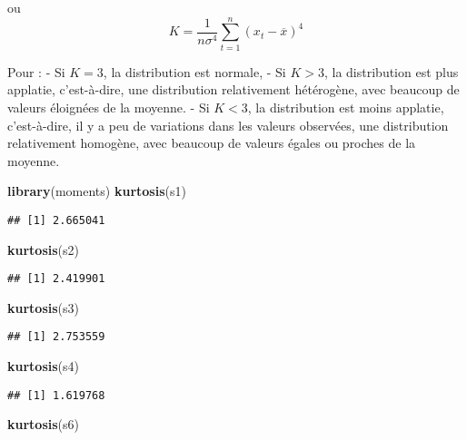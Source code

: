 \documentclass[
]{book}
\newenvironment{Shaded}{\begin{snugshade}}{\end{snugshade}}
\newcommand{\FunctionTok}[1]{\textcolor[rgb]{0.13,0.29,0.53}{\textbf{#1}}}
\newcommand{\NormalTok}[1]{#1}
\theoremstyle{definition}
\theoremstyle{definition}
\theoremstyle{definition}
\theoremstyle{definition}
\theoremstyle{remark}
\begin{document}
ou
\[K = \frac{1}{n\sigma^4} \sum_{t=1}^n (x_t - \overline{x})^4 \]

Pour :
- Si \(K=3\), la distribution est normale,
- Si \(K>3\), la distribution est plus applatie, c'est-à-dire, une distribution relativement hétérogène, avec beaucoup de valeurs éloignées de la moyenne.
- Si \(K<3\), la distribution est moins applatie, c'est-à-dire, il y a peu de variations dans les valeurs observées, une distribution relativement homogène, avec beaucoup de valeurs égales ou proches de la moyenne.

\begin{Shaded}
\begin{Highlighting}[]
\FunctionTok{library}\NormalTok{(moments)}
\FunctionTok{kurtosis}\NormalTok{(s1)}
\end{Highlighting}
\end{Shaded}

\begin{verbatim}
## [1] 2.665041
\end{verbatim}

\begin{Shaded}
\begin{Highlighting}[]
\FunctionTok{kurtosis}\NormalTok{(s2)}
\end{Highlighting}
\end{Shaded}

\begin{verbatim}
## [1] 2.419901
\end{verbatim}

\begin{Shaded}
\begin{Highlighting}[]
\FunctionTok{kurtosis}\NormalTok{(s3)}
\end{Highlighting}
\end{Shaded}

\begin{verbatim}
## [1] 2.753559
\end{verbatim}

\begin{Shaded}
\begin{Highlighting}[]
\FunctionTok{kurtosis}\NormalTok{(s4)}
\end{Highlighting}
\end{Shaded}

\begin{verbatim}
## [1] 1.619768
\end{verbatim}

\begin{Shaded}
\begin{Highlighting}[]
\FunctionTok{kurtosis}\NormalTok{(s6)}
\end{Highlighting}
\end{Shaded}
\end{document}
